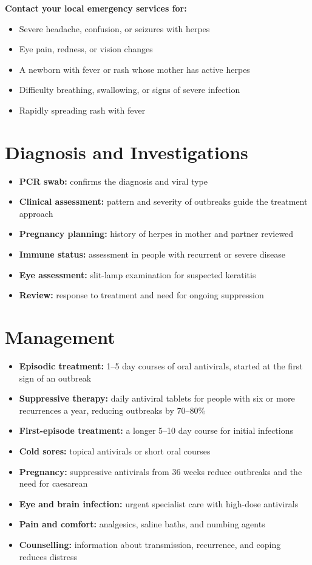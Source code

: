 \textbf{Contact your local emergency services for:}
\begin{itemize}
    \item Severe headache, confusion, or seizures with herpes
    \item Eye pain, redness, or vision changes
    \item A newborn with fever or rash whose mother has active herpes
    \item Difficulty breathing, swallowing, or signs of severe infection
    \item Rapidly spreading rash with fever
\end{itemize}

\section*{Diagnosis and Investigations}
\begin{itemize}
    \item \textbf{PCR swab:} confirms the diagnosis and viral type
    \item \textbf{Clinical assessment:} pattern and severity of outbreaks guide the treatment approach
    \item \textbf{Pregnancy planning:} history of herpes in mother and partner reviewed
    \item \textbf{Immune status:} assessment in people with recurrent or severe disease
    \item \textbf{Eye assessment:} slit-lamp examination for suspected keratitis
    \item \textbf{Review:} response to treatment and need for ongoing suppression
\end{itemize}

\section*{Management}
\begin{itemize}
    \item \textbf{Episodic treatment:} 1--5 day courses of oral antivirals, started at the first sign of an outbreak
    \item \textbf{Suppressive therapy:} daily antiviral tablets for people with six or more recurrences a year, reducing outbreaks by 70--80\%
    \item \textbf{First-episode treatment:} a longer 5--10 day course for initial infections
    \item \textbf{Cold sores:} topical antivirals or short oral courses
    \item \textbf{Pregnancy:} suppressive antivirals from 36 weeks reduce outbreaks and the need for caesarean
    \item \textbf{Eye and brain infection:} urgent specialist care with high-dose antivirals
    \item \textbf{Pain and comfort:} analgesics, saline baths, and numbing agents
    \item \textbf{Counselling:} information about transmission, recurrence, and coping reduces distress
\end{itemize}

